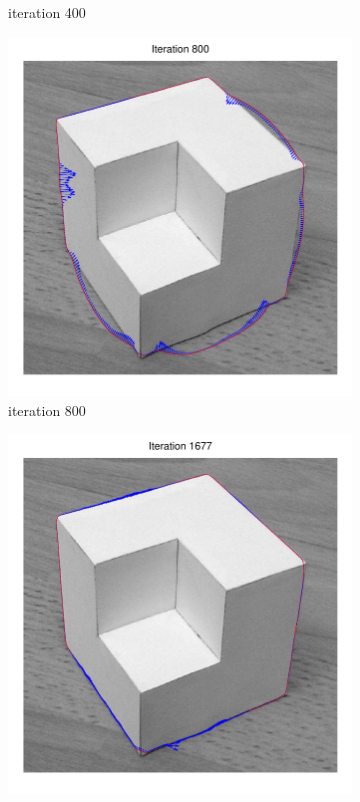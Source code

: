 \documentclass[11pt,a4paper]{article}
\begin{document}
\begin{figure}[H]
\begin{subfigure}[t]{0.24\textwidth}
        \caption{iteration 400}
        \label{fig:cubic_400}
    \end{subfigure}
    \begin{subfigure}[t]{0.24\textwidth}
        \includegraphics[width=\textwidth]{src/images/cubic_800.pdf}
        \caption{iteration 800}
        \label{fig:cubic_800}
    \end{subfigure}
    \begin{subfigure}[t]{0.24\textwidth}
        \includegraphics[width=\textwidth]{src/images/cubic_1677.pdf}

\end{subfigure}
\end{figure}
\end{document}
